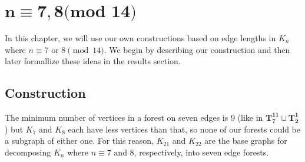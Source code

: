 \chapter{$\mathbf{n\equiv 7,8\textbf{(mod 14)}}$} \label{chap:7,8 (mod 14)}
In this chapter, we will use our own constructions based on edge lengths in $K_{n}$ where $n \equiv 7\text{ or }8 \pmod{14}$. We begin by describing our construction and then later formallize these ideas in the results section.
\section{Construction}\label{sec:7,8constr}
The minimum number of vertices in a forest on seven edges is $9$ (like in $\mathbf{T_{7}^{11}\sqcup T_{2}^{1}}$) but $K_{7}$ and $K_{8}$ each have less vertices than that, so none of our forests could be a subgraph of either one. For this reason, $K_{21}$ and $K_{22}$ are the base graphs for decomposing $K_{n}$ where $n\equiv 7\text{ and }8$, respectively, into seven edge forests.
